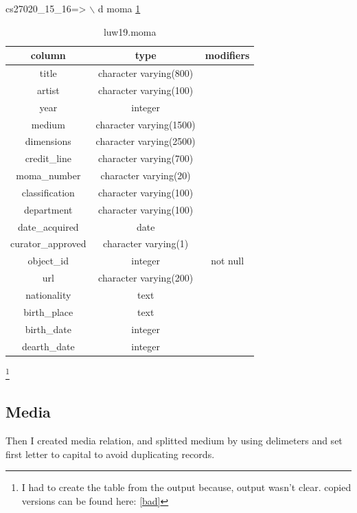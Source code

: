 \documentclass[journal,transmag]{IEEEtran}
\begin{document}
cs27020\_15\_16=> $\backslash$ d moma \ref{moma}
\begin{table}[]
\centering
\caption{luw19.moma}
\label{moma}
\begin{tabular}{c|c|c}
column            & type                    & modifiers \\ \hline
title             & character varying(800)  &           \\
artist            & character varying(100)  &           \\
year              & integer                 &           \\
medium            & character varying(1500) &           \\
dimensions        & character varying(2500) &           \\
credit\_line      & character varying(700)  &           \\
moma\_number      & character varying(20)   &           \\
classification    & character varying(100)  &           \\
department        & character varying(100)  &           \\
date\_acquired    & date                    &           \\
curator\_approved & character varying(1)    &           \\
object\_id        & integer                 & not null  \\
url               & character varying(200)  &           \\
nationality       & text                    &           \\
birth\_place      & text                    &           \\
birth\_date       & integer                 &           \\
dearth\_date      & integer                 &          
\end{tabular}
\end{table}
\footnote{I had to create the table from the output because, output wasn't clear. copied versions can be found here: \ref{bad}}

\subsection {Media}

Then I created media relation, and splitted medium by using delimeters and set first letter to capital to avoid duplicating records. 
\newline
\end{document}
